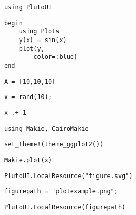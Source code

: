\newpage
\begin{lstlisting}[language=JuliaLocal, style=julia]
using PlutoUI
\end{lstlisting}

\begin{lstlisting}[language=JuliaLocal, style=julia]
begin
	using Plots
	y(x) = sin(x)
	plot(y,
		color=:blue)
end
\end{lstlisting}

\begin{lstlisting}[language=JuliaLocal, style=julia]
A = [10,10,10]
\end{lstlisting}

\begin{lstlisting}[language=JuliaLocal, style=julia]
x = rand(10);
\end{lstlisting}

\begin{lstlisting}[language=JuliaLocal, style=julia]
x .+ 1
\end{lstlisting}

\begin{lstlisting}[language=JuliaLocal, style=julia]
using Makie, CairoMakie
\end{lstlisting}

\begin{lstlisting}[language=JuliaLocal, style=julia]
set_theme!(theme_ggplot2())
\end{lstlisting}

\begin{lstlisting}[language=JuliaLocal, style=julia]
Makie.plot(x)
\end{lstlisting}

\begin{lstlisting}[language=JuliaLocal, style=julia]
PlutoUI.LocalResource("figure.svg")
\end{lstlisting}

\begin{lstlisting}[language=JuliaLocal, style=julia]
figurepath = "plotexample.png";
\end{lstlisting}

\begin{lstlisting}[language=JuliaLocal, style=julia]
PlutoUI.LocalResource(figurepath)
\end{lstlisting}
